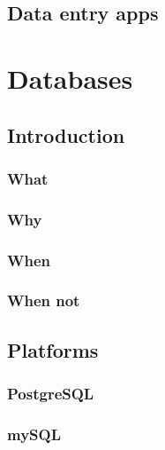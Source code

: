 \documentclass[
]{book}
\begin{document}
\hypertarget{data-entry-apps}{%
\chapter{Data entry apps}\label{data-entry-apps}}

\hypertarget{part-databases}{%
\part{Databases}\label{part-databases}}

\hypertarget{introduction-2}{%
\chapter{Introduction}\label{introduction-2}}

\hypertarget{what}{%
\section{What}\label{what}}

\hypertarget{why}{%
\section{Why}\label{why}}

\hypertarget{when}{%
\section{When}\label{when}}

\hypertarget{when-not}{%
\section{When not}\label{when-not}}

\hypertarget{platforms}{%
\chapter{Platforms}\label{platforms}}

\hypertarget{postgresql}{%
\section{PostgreSQL}\label{postgresql}}

\hypertarget{mysql}{%
\section{mySQL}\label{mysql}}
\end{document}

